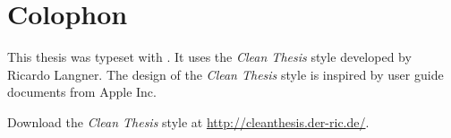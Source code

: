 %
\pagestyle{empty}
\hfill
\vfill
{}
\section*{Colophon}

This thesis was typeset with \LaTeXe.  It uses the \textit{Clean
Thesis} style developed by Ricardo Langner.  The design of the
\textit{Clean Thesis} style is inspired by user guide documents
from Apple Inc.

Download the \textit{Clean Thesis} style at
\url{http://cleanthesis.der-ric.de/}.
